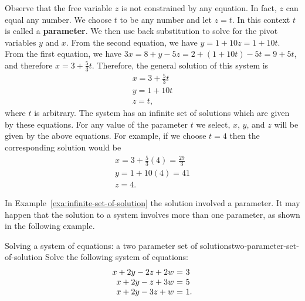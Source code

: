 \begin{solution}
  Observe that the free variable $z$ is not constrained by any
  equation. In fact, $z$ can equal any number. We choose $t$ to be any
  number and let $z = t$.  In this context $t$ is called a
  \textbf{parameter}. We then use back substitution
  to solve for the pivot variables $y$ and $x$. From the second
  equation, we have $y = 1+10z = 1+10t$. From the first equation, we
  have $3x = 8+y-5z = 2+(1+10t)-5t = 9+5t$, and therefore
  $x=3+\frac{5}{3}t$. Therefore, the general solution of this system
  is
  \begin{equation*}
    \begin{array}{l}
      x=3+\frac{5}{3}t \\
      y=1+10t \\
      z=t,
    \end{array}
  \end{equation*}
  where $t$ is arbitrary. The system has an infinite set of solutions
  which are given by these equations. For any value of the parameter
  $t$ we select, $x$, $y$, and $z$ will be given by the above
  equations. For example, if we choose $t=4$ then the corresponding
  solution would be
  \begin{equation*}
    \begin{array}{l}
      x = 3 + \frac{5}{3}(4) = \frac{29}{3} \\
      y = 1+10(4) = 41 \\
      z = 4.
    \end{array}
  \end{equation*}
\end{solution}

In Example~\ref{exa:infinite-set-of-solution} the solution involved a
parameter. It may happen that the solution to a system involves more
than one parameter, as shown in the following example.

\begin{example}{Solving a system of equations: a two parameter set of solutions}{two-parameter-set-of-solution}
  Solve the following system of equations:
  \begin{equation*}
    \begin{array}{r@{~}c@{~}l}
      x + 2y - 2z + 2w &=& 3 \\
      x + 2y - z  + 3w &=& 5 \\
      x + 2y - 3z + w &=& 1.
    \end{array}
  \end{equation*}
\end{example}


